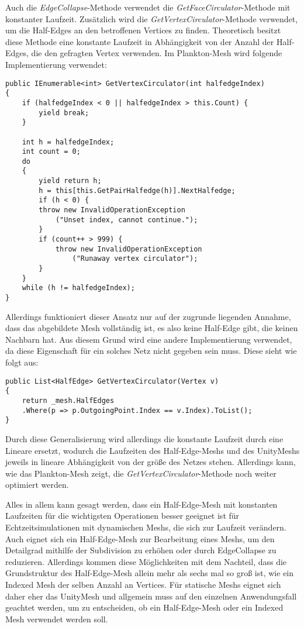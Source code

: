 Auch die \textit{EdgeCollapse}-Methode verwendet die \textit{GetFaceCirculator}-Methode mit konstanter Laufzeit. Zus\"atzlich wird die \textit{GetVertexCirculator}-Methode verwendet, um die Half-Edges an den betroffenen Vertices zu finden. Theoretisch besitzt diese Methode eine konstante Laufzeit in Abh\"angigkeit von der Anzahl der Half-Edges, die den gefragten Vertex verwenden. Im Plankton-Mesh \cite{Meshmash2017} wird folgende Implementierung verwendet:
\begin{lstlisting}
public IEnumerable<int> GetVertexCirculator(int halfedgeIndex)
{
	if (halfedgeIndex < 0 || halfedgeIndex > this.Count) { 
		yield break; 
	}
	
	int h = halfedgeIndex;
	int count = 0;
	do
	{
		yield return h;
		h = this[this.GetPairHalfedge(h)].NextHalfedge;
		if (h < 0) { 
		throw new InvalidOperationException
			("Unset index, cannot continue."); 
		}
		if (count++ > 999) {
			throw new InvalidOperationException
				("Runaway vertex circulator"); 
		}
	}
	while (h != halfedgeIndex);
}
\end{lstlisting}
Allerdings funktioniert dieser Ansatz nur auf der zugrunde liegenden Annahme, dass das abgebildete Mesh vollst\"andig ist, es also keine Half-Edge gibt, die keinen Nachbarn hat. Aus diesem Grund wird eine andere Implementierung verwendet, da diese Eigenschaft f\"ur ein solches Netz nicht gegeben sein muss. Diese sieht wie folgt aus: 
\begin{lstlisting}
public List<HalfEdge> GetVertexCirculator(Vertex v)
{
	return _mesh.HalfEdges
	.Where(p => p.OutgoingPoint.Index == v.Index).ToList();
}
\end{lstlisting}
Durch diese Generalisierung wird allerdings die konstante Laufzeit durch eine Lineare ersetzt, wodurch die Laufzeiten des Half-Edge-Meshs und des UnityMeshs jeweils in lineare Abh\"angigkeit von der gr\"o{\ss}e des Netzes stehen. Allerdings kann, wie das Plankton-Mesh zeigt, die \textit{GetVertexCirculator}-Methode noch weiter optimiert werden. 

Alles in allem kann gesagt werden, dass ein Half-Edge-Mesh mit konstanten Laufzeiten f\"ur die wichtigsten Operationen besser geeignet ist f\"ur Echtzeitsimulationen mit dynamischen Meshs, die sich zur Laufzeit ver\"andern. Auch eignet sich ein Half-Edge-Mesh zur Bearbeitung eines Meshs, um den Detailgrad mithilfe der Subdivision zu erh\"ohen oder durch EdgeCollapse zu reduzieren. Allerdings kommen diese M\"oglichkeiten mit dem Nachteil, dass die Grundstruktur des Half-Edge-Mesh allein mehr als sechs mal so gro{\ss} ist, wie ein Indexed Mesh der selben Anzahl an Vertices. F\"ur statische Meshs eignet sich daher eher das UnityMesh und allgemein muss auf den einzelnen Anwendungsfall geachtet werden, um zu entscheiden, ob ein Half-Edge-Mesh oder ein Indexed Mesh verwendet werden soll.


